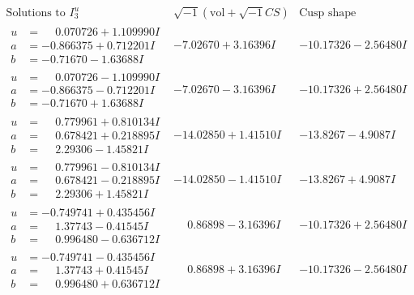 \documentclass[1p]{elsarticle_modified}
\theoremstyle{definition}
\newcommand{\I}{\sqrt{-1}}
\begin{document}
$$\begin{array}{c|c|c}  
\text{Solutions to }I^u_{3}& \I (\text{vol} + \sqrt{-1}CS) & \text{Cusp shape}\\
 \hline 
\begin{aligned}
u &= \phantom{-}0.070726 + 1.109990 I \\
a &= -0.866375 + 0.712201 I \\
b &= -0.71670 - 1.63688 I\end{aligned}
 & -7.02670 + 3.16396 I & -10.17326 - 2.56480 I \\ \hline\begin{aligned}
u &= \phantom{-}0.070726 - 1.109990 I \\
a &= -0.866375 - 0.712201 I \\
b &= -0.71670 + 1.63688 I\end{aligned}
 & -7.02670 - 3.16396 I & -10.17326 + 2.56480 I \\ \hline\begin{aligned}
u &= \phantom{-}0.779961 + 0.810134 I \\
a &= \phantom{-}0.678421 + 0.218895 I \\
b &= \phantom{-}2.29306 - 1.45821 I\end{aligned}
 & -14.02850 + 1.41510 I & -13.8267 - 4.9087 I \\ \hline\begin{aligned}
u &= \phantom{-}0.779961 - 0.810134 I \\
a &= \phantom{-}0.678421 - 0.218895 I \\
b &= \phantom{-}2.29306 + 1.45821 I\end{aligned}
 & -14.02850 - 1.41510 I & -13.8267 + 4.9087 I \\ \hline\begin{aligned}
u &= -0.749741 + 0.435456 I \\
a &= \phantom{-}1.37743 - 0.41545 I \\
b &= \phantom{-}0.996480 - 0.636712 I\end{aligned}
 & \phantom{-}0.86898 - 3.16396 I & -10.17326 + 2.56480 I \\ \hline\begin{aligned}
u &= -0.749741 - 0.435456 I \\
a &= \phantom{-}1.37743 + 0.41545 I \\
b &= \phantom{-}0.996480 + 0.636712 I\end{aligned}
 & \phantom{-}0.86898 + 3.16396 I & -10.17326 - 2.56480 I \\ \hline\begin{aligned}

\end{aligned}
\end{array}$$
\end{document}
